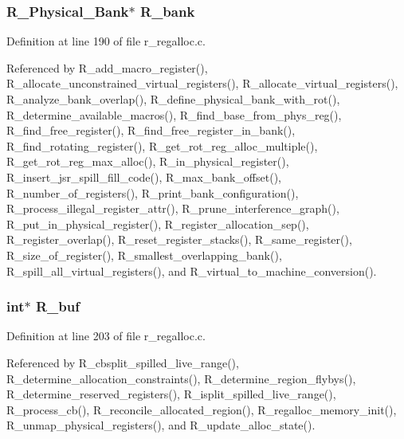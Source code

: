 \subsubsection{\setlength{\rightskip}{0pt plus 5cm}\bf{R\_\-Physical\_\-Bank}$\ast$ \bf{R\_\-bank}}\label{r__regalloc_8h_7c53b9c99d7cdeb5f475a3ea6133b616}




Definition at line 190 of file r\_\-regalloc.c.

Referenced by R\_\-add\_\-macro\_\-register(), R\_\-allocate\_\-unconstrained\_\-virtual\_\-registers(), R\_\-allocate\_\-virtual\_\-registers(), R\_\-analyze\_\-bank\_\-overlap(), R\_\-define\_\-physical\_\-bank\_\-with\_\-rot(), R\_\-determine\_\-available\_\-macros(), R\_\-find\_\-base\_\-from\_\-phys\_\-reg(), R\_\-find\_\-free\_\-register(), R\_\-find\_\-free\_\-register\_\-in\_\-bank(), R\_\-find\_\-rotating\_\-register(), R\_\-get\_\-rot\_\-reg\_\-alloc\_\-multiple(), R\_\-get\_\-rot\_\-reg\_\-max\_\-alloc(), R\_\-in\_\-physical\_\-register(), R\_\-insert\_\-jsr\_\-spill\_\-fill\_\-code(), R\_\-max\_\-bank\_\-offset(), R\_\-number\_\-of\_\-registers(), R\_\-print\_\-bank\_\-configuration(), R\_\-process\_\-illegal\_\-register\_\-attr(), R\_\-prune\_\-interference\_\-graph(), R\_\-put\_\-in\_\-physical\_\-register(), R\_\-register\_\-allocation\_\-sep(), R\_\-register\_\-overlap(), R\_\-reset\_\-register\_\-stacks(), R\_\-same\_\-register(), R\_\-size\_\-of\_\-register(), R\_\-smallest\_\-overlapping\_\-bank(), R\_\-spill\_\-all\_\-virtual\_\-registers(), and R\_\-virtual\_\-to\_\-machine\_\-conversion().
\subsubsection{\setlength{\rightskip}{0pt plus 5cm}int$\ast$ \bf{R\_\-buf}}\label{r__regalloc_8h_b943b8403b8be5f723edae80d2e8201b}




Definition at line 203 of file r\_\-regalloc.c.

Referenced by R\_\-cbsplit\_\-spilled\_\-live\_\-range(), R\_\-determine\_\-allocation\_\-constraints(), R\_\-determine\_\-region\_\-flybys(), R\_\-determine\_\-reserved\_\-registers(), R\_\-isplit\_\-spilled\_\-live\_\-range(), R\_\-process\_\-cb(), R\_\-reconcile\_\-allocated\_\-region(), R\_\-regalloc\_\-memory\_\-init(), R\_\-unmap\_\-physical\_\-registers(), and R\_\-update\_\-alloc\_\-state().
